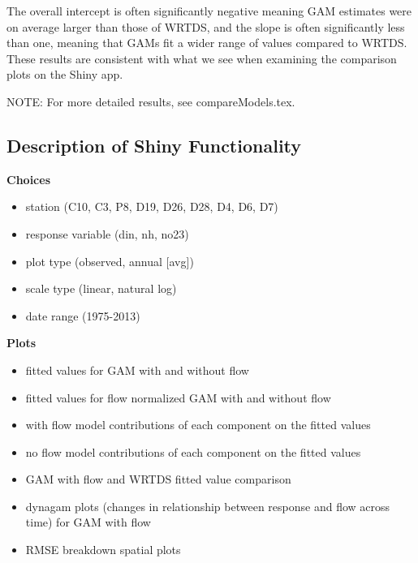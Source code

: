 \documentclass[12pt]{amsart}
\begin{document}
The overall intercept is often significantly negative meaning GAM estimates were on average larger than those of WRTDS, and the slope is often significantly less than one, meaning that GAMs fit a wider range of values compared to WRTDS. These results are consistent with what we see when examining the comparison plots on the Shiny app.

NOTE: For more detailed results, see compareModels.tex.

\subsection{Description of Shiny Functionality}


\textbf{Choices}
\begin{itemize}
\item station (C10, C3, P8, D19, D26, D28, D4, D6, D7)
\item response variable (din, nh, no23)
\item plot type (observed, annual [avg])
\item scale type (linear, natural log)
\item date range (1975-2013)
\end{itemize}

\textbf{Plots}
\begin{itemize}
\item fitted values for GAM with and without flow
\item fitted values for flow normalized GAM with and without flow 
\item with flow model contributions of each component  on the fitted values
\item no flow model contributions of each component  on the fitted values
\item GAM with flow and WRTDS fitted value comparison
\item dynagam plots (changes in relationship between response and flow across time) for GAM with flow 
\item RMSE breakdown spatial plots
\end{itemize}
\end{document}
